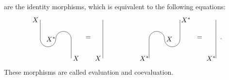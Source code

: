\begin{defn}
\begin{align}
			\end{align}
		are the identity morphisms, which is equivalent to the following equations: 
			\begin{align}
				\begin{tikzpicture}[baseline=(current bounding box.center)]
					\draw (0,0) -- (0,1);
					\draw (0,1) arc (0:180:0.4);
					\draw (-0.8,1) arc (0:-180:0.4);
					\draw (-1.6,1) -- (-1.6,2);
					\node at (0.25,0) {$X$};
					\node at (-1.85,2) {$X$};
					\node at (-1.05,1) {$X^*$};
				\end{tikzpicture}\ =
				\begin{tikzpicture}[baseline=(current bounding box.center)]
					\draw (0,0) -- (0,2);
					\node at (-0.25,0)  {$X$};
					\node at (-0.25,2) {\phantom{$X$}};
				\end{tikzpicture}\hspace{50pt}
				\begin{tikzpicture}[baseline=(current bounding box.center)]
					\draw (0,0) -- (0,1);
					\draw (0,1) arc (180:0:0.4);
					\draw (0.8,1) arc (-180:0:0.4);
					\draw (1.6,1) -- (1.6,2);
					\node at (-0.25,0) {$X^*$};
					\node at (1.85,2) {$\ X^*$};
					\node at (1.05,1) {$X$};
				\end{tikzpicture}\ =
				\begin{tikzpicture}[baseline=(current bounding box.center)]
					\draw (0,0) -- (0,2);
					\node at (-0.25,0)  {$X^*$};
					\node at (-0.25,2) {\phantom{$X^*$}};
				\end{tikzpicture}\ .
			\end{align}
		These morphisms are called evaluation and coevaluation.
	\end{defn}

